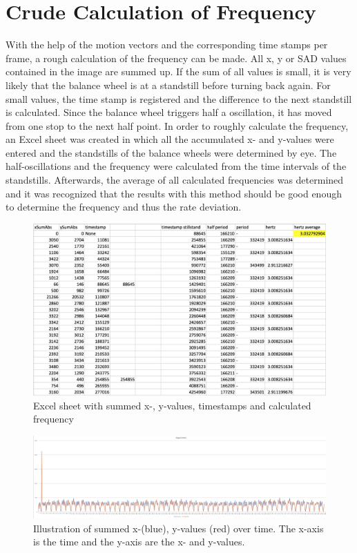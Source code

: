 \documentclass[12pt, a4paper]{report}
\begin{document}
     \section{Crude Calculation of Frequency}
    With the help of the motion vectors and the corresponding time stamps per frame, a rough calculation of the frequency can be made. All x, y or SAD values contained in the image are summed up. If the sum of all values is small, it is very likely that the balance wheel is at a standstill before turning back again. For small values, the time stamp is registered and the difference to the next standstill is calculated. Since the balance wheel triggers half a oscillation, it has moved from one stop to the next half point. 
    In order to roughly calculate the frequency, an Excel sheet was created in which all the accumulated x- and y-values were entered and the standstills of the balance wheels were determined by eye. The half-oscillations and the frequency were calculated from the time intervals of the standstills. Afterwards, the average of all calculated frequencies was determined and it was recognized that the results with this method should be good enough to determine the frequency and thus the rate deviation. 
    
    \noindent
    \begin{figure}[H]
    \centering
    \includegraphics[scale=0.45]{Images/excel_sheet_numbers.png}
    
    \caption{Excel sheet with summed x-, y-values, timestamps and calculated frequency}
    \end{figure}

    \noindent
    \begin{figure}[H]
    \centering
    \includegraphics[scale=0.35]{Images/excel_sheet_graph.png}
    
    \caption{Illustration of summed x-(blue), y-values (red) over time. The x-axis is the time and the y-axis are the x- and y-values.}
    \end{figure}
    
\end{document}

